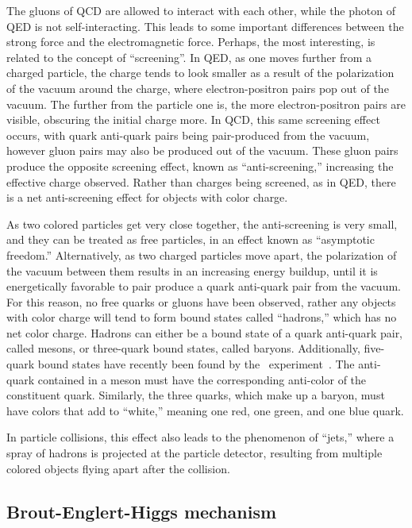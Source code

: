 The gluons of QCD are allowed to interact with each other, while the photon of
QED is not self-interacting.
This leads to some important differences between the strong force and the
electromagnetic force.
Perhaps, the most interesting, is related to the concept of ``screening''.
In QED, as one moves further from a charged particle, the charge tends to look
smaller as a result of the polarization of the vacuum around the charge, where
electron-positron pairs pop out of the vacuum.
The further from the particle one is, the more electron-positron pairs are
visible, obscuring the initial charge more.
In QCD, this same screening effect occurs, with quark anti-quark pairs being
pair-produced from the vacuum, however gluon pairs may also be produced out of
the vacuum.
These gluon pairs produce the opposite screening effect, known as
``anti-screening,'' increasing the effective charge observed.
Rather than charges being screened, as in QED, there is a net anti-screening
effect for objects with color charge.

As two colored particles get very close together, the anti-screening is very
small, and they can be treated as free particles, in an effect known as
``asymptotic freedom.''
Alternatively, as two charged particles move apart, the polarization of the
vacuum between them results in an increasing energy buildup, until it is
energetically favorable to pair produce a quark anti-quark pair from the vacuum.
For this reason, no free quarks or gluons have been observed, rather any
objects with color charge will tend to form bound states called ``hadrons,''
which has no net color charge.
Hadrons can either be a bound state of a quark anti-quark pair, called mesons,
or three-quark bound states, called baryons.
Additionally, five-quark bound states have recently been found by the
\lhcb\ experiment~\cite{Aaij:2015tga}.
The anti-quark contained in a meson must have the corresponding anti-color of 
the constituent quark.
Similarly, the three quarks, which make up a baryon, must have colors that add
to ``white,'' meaning one red, one green, and one blue quark.

In particle collisions, this effect also leads to the phenomenon of ``jets,''
where a spray of hadrons is projected at the particle detector, resulting from
multiple colored objects flying apart after the collision.

\FloatBarrier
\subsection{Brout-Englert-Higgs mechanism}
\label{sec:higgs}

